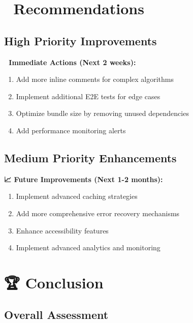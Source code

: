 \documentclass[11pt,a4paper]{article}
\begin{document}
\section{🔧 Recommendations}

\subsection{High Priority Improvements}

\begin{tcolorbox}[colback=warningOrange!10,colframe=warningOrange]
\textbf{🎯 Immediate Actions (Next 2 weeks):}
\begin{enumerate}
    \item Add more inline comments for complex algorithms
    \item Implement additional E2E tests for edge cases
    \item Optimize bundle size by removing unused dependencies
    \item Add performance monitoring alerts
\end{enumerate}
\end{tcolorbox}

\subsection{Medium Priority Enhancements}

\begin{tcolorbox}[colback=jupiterBlue!10,colframe=jupiterBlue]
\textbf{📈 Future Improvements (Next 1-2 months):}
\begin{enumerate}
    \item Implement advanced caching strategies
    \item Add more comprehensive error recovery mechanisms
    \item Enhance accessibility features
    \item Implement advanced analytics and monitoring
\end{enumerate}
\end{tcolorbox}

\section{🏆 Conclusion}

\subsection{Overall Assessment}
\end{document}

